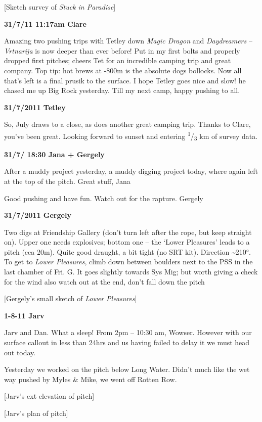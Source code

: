 {[}Sketch survey of \emph{Stuck in Paradise}{]}

\textbf{31/7/11 11:17am Clare}

Amazing two pushing trips with Tetley down \emph{Magic Dragon} and
\emph{Daydreamers} -- \emph{Vrtnarija} is now deeper than ever before!
Put in my first bolts and properly dropped first pitches; cheers Tet for
an incredible camping trip and great company. Top tip: hot brews at
-800m is the absolute dogs bollocks. Now all that's left is a final
prusik to the surface. I hope Tetley goes nice and slow! he chased me up
Big Rock yesterday. Till my next camp, happy pushing to all.

\textbf{31/7/2011 Tetley}

So, July draws to a close, as does another great camping trip. Thanks to
Clare, you've been great. Looking forward to sunset and entering
\textsuperscript{1}/\textsubscript{3} km of survey data.

\textbf{31/7/ 18:30 Jana + Gergely}

After a muddy project yesterday, a muddy digging project today, where
again left at the top of the pitch. Great stuff, Jana

Good pushing and have fun. Watch out for the rapture. Gergely

\textbf{31/7/2011 Gergely}

Two digs at Friendship Gallery (don't turn left after the rope, but keep
straight on). Upper one needs explosives; bottom one -- the `Lower
Pleasures' leads to a pitch (cca 20m). Quite good draught, a bit tight
(no SRT kit). Direction \textasciitilde{}210°. To get to \emph{Lower
Pleasures}, climb down between boulders next to the PSS in the last
chamber of Fri. G. It goes slightly towards Sys Mig; but worth giving a
check for the wind also watch out at the end, don't fall down the pitch

{[}Gergely's small sketch of \emph{Lower Pleasures}{]}

\textbf{1-8-11 Jarv}

Jarv and Dan. What a sleep! From 2pm -- 10:30 am, Wowser. However with
our surface callout in less than 24hrs and us having failed to delay it
we must head out today.

Yesterday we worked on the pitch below Long Water. Didn't much like the
wet way pushed by Myles \& Mike, we went off Rotten Row.

{[}Jarv's ext elevation of pitch{]}

{[}Jarv's plan of pitch{]}

